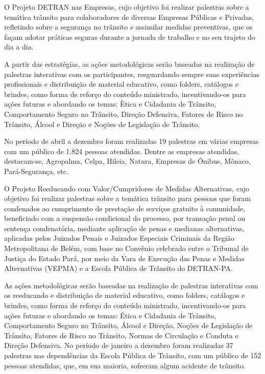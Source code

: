 \documentclass[a4paper]{article}
\begin{document}
O Projeto DETRAN nas Empresas, cujo objetivo foi realizar palestras sobre a temática trânsito para colaboradores de diversas Empresas Públicas e Privadas, refletindo sobre a segurança no trânsito e assimilar medidas preventivas, que os façam adotar práticas seguras durante a jornada de trabalho e no seu trajeto do dia a dia.\vskip0.3cm


A partir das estratégias, as ações metodológicas serão baseadas na realização de palestras interativas com os participantes, resguardando sempre suas experiências profissionais e distribuição de material educativo, como folders, catálogos e brindes, como forma de reforço do conteúdo ministrado, incentivando-os para ações futuras e abordando os temas: Ètica e Cidadania de Trânsito, Comportamento Seguro no Trânsito, Direção Defensiva, Fatores de Risco no Trânsito, Álcool e Direção e Noções de Legislação de Trânsito.
\vskip0.3cm
  
No período de abril a dezembro foram realizadas 19 palestras em várias empresas com um público de 1.824 pessoas atendidas. Dentre as empresas atendidas, destacam-se, Agropalma, Celpa, Hileia, Natura, Empresas de Ônibus, Mônaco, Pará-Segurança, etc. 
\vskip0.3cm

O Projeto Reeducando com Valor/Cumpridores de Medidas Alternativas, cujo objetivo foi realizar palestras sobre a temática trânsito para pessoas que foram condenados ao cumprimento de prestação de serviços gratuito à comunidade, beneficiado com a suspensão condicional do processo, por transação penal ou sentença condenatória, mediante aplicação de penas e medianas alternativas, aplicadas pelos Juizados Penais e Juizados Especiais Criminais da Região Metropolitana de Belém, com base no Convênio celebrado entre o Tribunal de Justiça do Estado Pará, por meio da Vara de Execução das Penas e Medidas Alternativas (VEPMA) e a Escola Pública de Trânsito do DETRAN-PA. 
\vskip0.3cm

As ações metodológicas serão baseadas na realização de palestras interativas com os reeducando e distribuição de material educativo, como folders, catálogos e brindes, como forma de reforço do conteúdo ministrado, incentivando-os para ações futuras e abordando os temas: Ética e Cidadania de Trânsito, Comportamento Seguro no Trânsito, Álcool e Direção, Noções de Legislação de Trânsito, Fatores de Risco no Trânsito, Normas de Circulação e Conduta e Direção Defensiva. No período de janeiro a dezembro foram realizadas 37 palestras nas dependências da Escola Pública de Trânsito, com um público de 152 pessoas atendidas, que, em sua maioria, sofreram algum acidente de trânsito.
\vskip0.3cm
\end{document}
